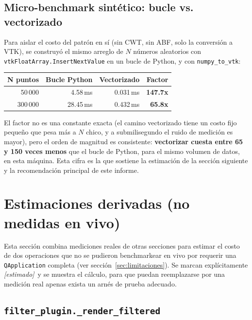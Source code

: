 \documentclass[11pt,a4paper]{article}
\newcommand{\estmark}{\textcolor{gris}{\textit{[estimado]}}}
\begin{document}
\subsection{Micro-benchmark sintético: bucle vs. vectorizado}
\label{sec:micro-bench}

Para aislar el costo del patrón en sí (sin CWT, sin ABF, solo la conversión a VTK), se construyó el mismo
arreglo de $N$ números aleatorios con \texttt{vtkFloatArray.InsertNextValue} en un bucle de Python, y con
\texttt{numpy\_\allowbreak to\_\allowbreak vtk}:

\begin{center}
\begin{tabular}{rrrr}
\toprule
\textbf{N puntos} & \textbf{Bucle Python} & \textbf{Vectorizado} & \textbf{Factor} \\
\midrule
50\,000  & 4.58\,ms  & 0.031\,ms & \textbf{147.7x} \\
300\,000 & 28.45\,ms & 0.432\,ms & \textbf{65.8x} \\
\bottomrule
\end{tabular}
\end{center}

El factor no es una constante exacta (el camino vectorizado tiene un costo fijo pequeño que pesa más a $N$
chico, y a submilisegundo el ruido de medición es mayor), pero el orden de magnitud es consistente:
\textbf{vectorizar cuesta entre 65 y 150 veces menos} que el bucle de Python, para el mismo volumen de datos,
en esta máquina. Esta cifra es la que sostiene la estimación de la sección siguiente y la recomendación
principal de este informe.

\newpage
\section{Estimaciones derivadas (no medidas en vivo)}
\label{sec:estimaciones}

Esta sección combina mediciones reales de otras secciones para estimar el costo de dos operaciones que no se
pudieron benchmarkear en vivo por requerir una \texttt{QApplication} completa (ver
sección~\ref{sec:limitaciones}). Se marcan explícitamente \estmark\ y se muestra el cálculo, para que puedan
reemplazarse por una medición real apenas exista un arnés de prueba adecuado.

\subsection{\texttt{filter\_\allowbreak plugin.\_\allowbreak render\_\allowbreak filtered}}
\end{document}
